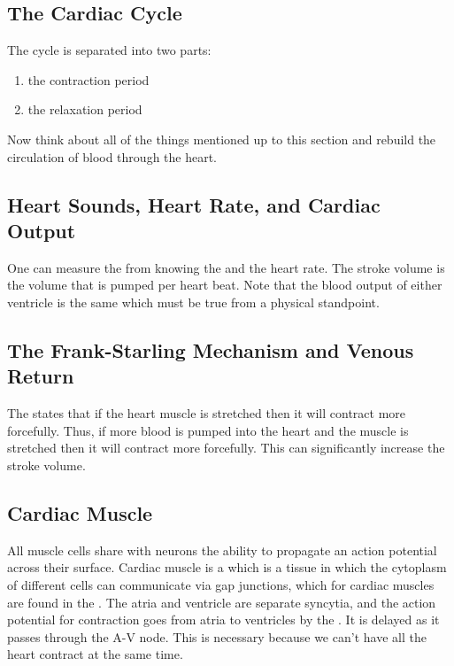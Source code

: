 \documentclass[../Bio_chemistryReview.tex]{subfiles}
\begin{document}
\subsection{The Cardiac Cycle}
The cycle is separated into two parts:
\begin{enumerate}
  \item {} the contraction period
  \item {} the relaxation period
\end{enumerate}
Now think about all of the things mentioned up to this section and rebuild the
circulation of blood through the heart.

\subsection{Heart Sounds, Heart Rate, and Cardiac Output}
One can measure the  from knowing the  and the heart rate. The stroke volume is the volume that is pumped per
heart beat. Note that the blood output of either ventricle is the same which
must be true from a physical standpoint.

\subsection{The Frank-Starling Mechanism and Venous Return}
The  states that if the heart muscle is
stretched then it will contract more forcefully. Thus, if more blood is pumped
into the heart and the muscle is stretched then it will contract more
forcefully. This can significantly increase the stroke volume.

\subsection{Cardiac Muscle}
All muscle cells share with neurons the ability to propagate an action potential
across their surface. Cardiac muscle is a  which
is a tissue in which the cytoplasm of different cells can communicate via gap
junctions, which for cardiac muscles are found in the . The atria and ventricle are separate syncytia, and the action potential
for contraction goes from atria to ventricles by the . It is delayed as it passes through the A-V node. This is necessary
because we can't have all the heart contract at the same time.\par
\end{document}
